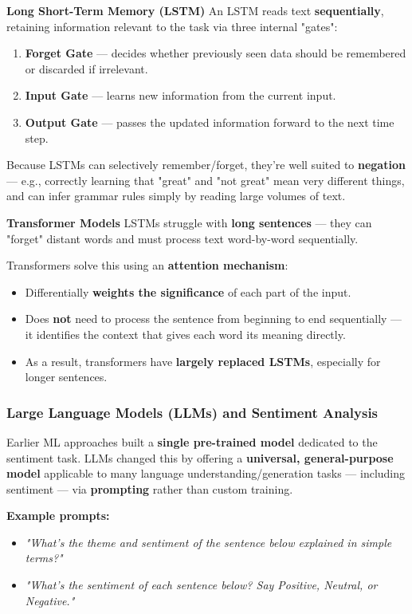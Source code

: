 \documentclass[12pt,openany]{book}
\begin{document}
\textbf{Long Short-Term Memory (LSTM)}
An LSTM reads text \textbf{sequentially}, retaining information relevant to the task via three internal "gates":
\begin{enumerate}[leftmargin=*]
    \item \textbf{Forget Gate} --- decides whether previously seen data should be remembered or discarded if irrelevant.
    \item \textbf{Input Gate} --- learns new information from the current input.
    \item \textbf{Output Gate} --- passes the updated information forward to the next time step.
\end{enumerate}

Because LSTMs can selectively remember/forget, they're well suited to \textbf{negation} --- e.g., correctly learning that "great" and "not great" mean very different things, and can infer grammar rules simply by reading large volumes of text.

\textbf{Transformer Models}
LSTMs struggle with \textbf{long sentences} --- they can "forget" distant words and must process text word-by-word sequentially.

Transformers solve this using an \textbf{attention mechanism}:
\begin{itemize}[leftmargin=*]
    \item Differentially \textbf{weights the significance} of each part of the input.
    \item Does \textbf{not} need to process the sentence from beginning to end sequentially --- it identifies the context that gives each word its meaning directly.
    \item As a result, transformers have \textbf{largely replaced LSTMs}, especially for longer sentences.
\end{itemize}

\subsubsection{Large Language Models (LLMs) and Sentiment Analysis}

Earlier ML approaches built a \textbf{single pre-trained model} dedicated to the sentiment task. LLMs changed this by offering a \textbf{universal, general-purpose model} applicable to many language understanding/generation tasks --- including sentiment --- via \textbf{prompting} rather than custom training.

\textbf{Example prompts:}
\begin{itemize}[leftmargin=*]
    \item \textit{"What's the theme and sentiment of the sentence below explained in simple terms?"}
    \item \textit{"What's the sentiment of each sentence below? Say Positive, Neutral, or Negative."}
\end{itemize}
\end{document}
